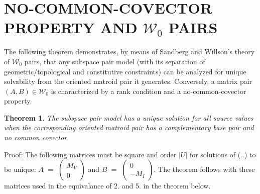 \documentclass{article}
\newtheorem{theorem}{Theorem}[section]
\begin{document}
\section{NO-COMMON-COVECTOR PROPERTY AND $\mathcal{W}_0$ PAIRS}



The following theorem
demonstrates, by means of Sandberg and Willson's theory of 
$\mathcal{W}_0$ pairs, that any 
subspace pair model (with  its separation of
geometric/topological and constitutive constraints) can be analyzed
for unique solvability from the oriented matroid pair it generates.
Conversely, a matrix pair 
$(A,B)\in\mathcal{W}_0$ is characterized by a rank condition and a 
no-common-covector property.

\begin{theorem}
The subspace pair model has a unique solution for all source 
values when the corresponding oriented matroid pair has a complementary 
base pair and no common covector.
\end{theorem}

Proof:  The following matrices must be square and order $|U|$
for solutions of (..) to be unique:
$A$ $=$ $\left(\begin{array}{c}M_V\\ 0\end{array}\right)$ and
$B$ $=$ $\left(\begin{array}{c}0\\ -M_I\end{array}\right)$.
The theorem follows with these matrices used in the equivalance of 
2. and 5. in the theorem below.
\end{document}
